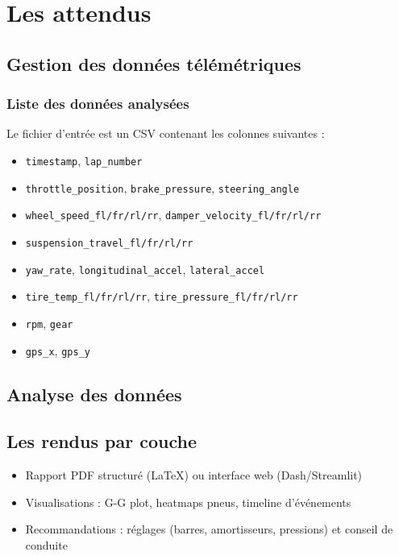 \documentclass[a4paper,12pt]{report}
\begin{document}
\section{Les attendus}

\subsection{Gestion des données télémétriques}

\subsubsection{Liste des données analysées}

Le fichier d'entrée est un CSV contenant les colonnes suivantes :
\begin{itemize}
    \item \texttt{timestamp}, \texttt{lap\_number}
    \item \texttt{throttle\_position}, \texttt{brake\_pressure}, \texttt{steering\_angle}
    \item \texttt{wheel\_speed\_fl/fr/rl/rr}, \texttt{damper\_velocity\_fl/fr/rl/rr}
    \item \texttt{suspension\_travel\_fl/fr/rl/rr}
    \item \texttt{yaw\_rate}, \texttt{longitudinal\_accel}, \texttt{lateral\_accel}
    \item \texttt{tire\_temp\_fl/fr/rl/rr}, \texttt{tire\_pressure\_fl/fr/rl/rr}
    \item \texttt{rpm}, \texttt{gear}
    \item \texttt{gps\_x}, \texttt{gps\_y}
\end{itemize}

\subsection{Analyse des données}

\subsection{Les rendus par couche}

\begin{itemize}
    \item Rapport PDF structuré (LaTeX) ou interface web (Dash/Streamlit)
    \item Visualisations : G-G plot, heatmaps pneus, timeline d’événements
    \item Recommandations : réglages (barres, amortisseurs, pressions) et conseil de conduite
\end{itemize}
\end{document}
